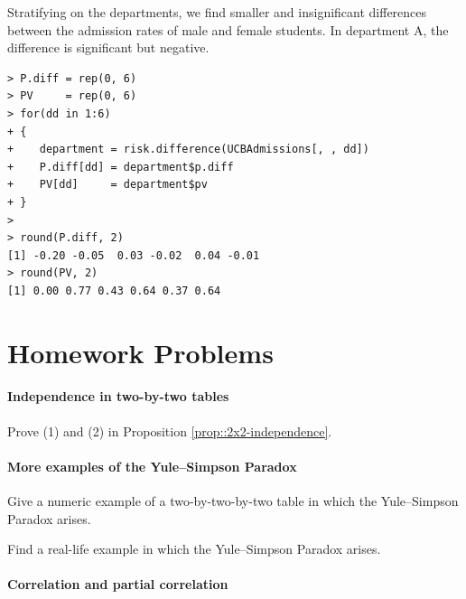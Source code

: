 Stratifying on the departments, we find smaller and insignificant differences between the admission rates of male and female students. In department A, the difference is significant but negative. 
\begin{lstlisting}
> P.diff = rep(0, 6)
> PV     = rep(0, 6)
> for(dd in 1:6)
+ {
+ 	 department = risk.difference(UCBAdmissions[, , dd])
+ 	 P.diff[dd] = department$p.diff
+ 	 PV[dd]     = department$pv 
+ }
> 
> round(P.diff, 2)
[1] -0.20 -0.05  0.03 -0.02  0.04 -0.01
> round(PV, 2)
[1] 0.00 0.77 0.43 0.64 0.37 0.64
\end{lstlisting} 



 



 
\section{Homework Problems}


\paragraph{Independence in two-by-two tables}\label{hw::2x2-equivalence}

Prove (1) and (2) in Proposition \ref{prop::2x2-independence}. 


\paragraph{More examples of the Yule--Simpson Paradox}


Give a numeric example of a two-by-two-by-two table in which the Yule--Simpson Paradox arises. 

Find a real-life example in which the Yule--Simpson Paradox arises. 



\paragraph{Correlation and partial correlation}\label{hw::partial-correlation}

